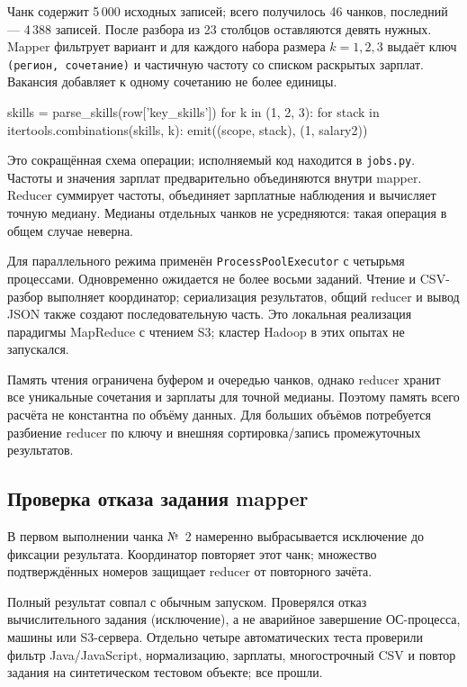 \documentclass[11pt,a4paper]{article}
\begin{document}
Чанк содержит 5\,000 исходных записей; всего получилось 46 чанков, последний --- 4\,388 записей. После разбора из 23 столбцов оставляются девять нужных. Mapper фильтрует вариант и для каждого набора размера $k=1,2,3$ выдаёт ключ \texttt{(регион, сочетание)} и частичную частоту со списком раскрытых зарплат. Вакансия добавляет к одному сочетанию не более единицы.
\begin{terminal}
skills = parse_skills(row['key_skills'])
for k in (1, 2, 3):
    for stack in itertools.combinations(skills, k):
        emit((scope, stack), (1, salary2))
\end{terminal}
Это сокращённая схема операции; исполняемый код находится в \texttt{jobs.py}. Частоты и значения зарплат предварительно объединяются внутри mapper. Reducer суммирует частоты, объединяет зарплатные наблюдения и вычисляет точную медиану. Медианы отдельных чанков не усредняются: такая операция в общем случае неверна.

Для параллельного режима применён \texttt{ProcessPoolExecutor} с четырьмя процессами. Одновременно ожидается не более восьми заданий. Чтение и CSV-разбор выполняет координатор; сериализация результатов, общий reducer и вывод JSON также создают последовательную часть. Это локальная реализация парадигмы MapReduce с чтением S3; кластер Hadoop в этих опытах не запускался.

Память чтения ограничена буфером и очередью чанков, однако reducer хранит все уникальные сочетания и зарплаты для точной медианы. Поэтому память всего расчёта не константна по объёму данных. Для больших объёмов потребуется разбиение reducer по ключу и внешняя сортировка/запись промежуточных результатов.

\subsection{Проверка отказа задания mapper}
В первом выполнении чанка №~2 намеренно выбрасывается исключение до фиксации результата. Координатор повторяет этот чанк; множество подтверждённых номеров защищает reducer от повторного зачёта.
Полный результат совпал с обычным запуском. Проверялся отказ вычислительного задания (исключение), а не аварийное завершение ОС-процесса, машины или S3-сервера. Отдельно четыре автоматических теста проверили фильтр Java/JavaScript, нормализацию, зарплаты, многострочный CSV и повтор задания на синтетическом тестовом объекте; все прошли.
\end{document}
